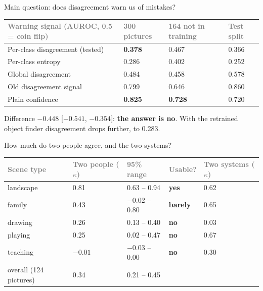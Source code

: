 \documentclass[aspectratio=169,11pt]{beamer}
\newcommand{\yes}[1]{\textcolor{accent}{\textbf{#1}}}
\newcommand{\no}[1]{\textcolor{warn}{\textbf{#1}}}
\newcommand{\h}[1]{\textcolor{grey}{#1}}
\newcommand{\remark}[1]{\par\vspace{0.35cm}{\small\textcolor{grey}{#1}}}
\begin{document}
\begin{frame}{Main question: does disagreement warn us of mistakes?}
\small
\begin{tabular}{@{}L{5.4cm} C{2.2cm} C{2.6cm} C{2.2cm}@{}}
\toprule
\h{Warning signal (AUROC, 0.5 = coin flip)} & \h{300 pictures} & \h{164 not in training} & \h{Test split}\\
\midrule
Per-class disagreement (tested) & \no{0.378} & 0.467 & 0.366\\
Per-class entropy & 0.286 & 0.402 & 0.252\\
Global disagreement & 0.484 & 0.458 & 0.578\\
Old disagreement signal & 0.799 & 0.646 & 0.860\\
Plain confidence & \yes{0.825} & \yes{0.728} & 0.720\\
\bottomrule
\end{tabular}

\vspace{0.3cm}
\normalsize
Difference $-0.448$ [$-0.541$, $-0.354$]: \textbf{the answer is no}. With the retrained object finder disagreement drops further, to 0.283.
\remark{Why: 65 of the 72 mistakes are faint pictures where all agents see nothing. They agree, and they are wrong together.}
\end{frame}

\begin{frame}{How much do two people agree, and the two systems?}
\begin{tabular}{@{}L{2.6cm} C{2.2cm} C{2.8cm} C{2.2cm} C{2.6cm}@{}}
\toprule
\h{Scene type} & \h{Two people ($\kappa$)} & \h{95\% range} & \h{Usable?} & \h{Two systems ($\kappa$)}\\
\midrule
landscape & 0.81 & 0.63 -- 0.94 & \yes{yes} & 0.62\\
family & 0.43 & $-0.02$ -- 0.80 & \no{barely} & 0.65\\
drawing & 0.26 & 0.13 -- 0.40 & \no{no} & 0.03\\
playing & 0.25 & 0.02 -- 0.47 & \no{no} & 0.67\\
teaching & $-0.01$ & $-0.03$ -- 0.00 & \no{no} & 0.30\\
\midrule
overall (124 pictures) & 0.34 & 0.21 -- 0.45 & & \\
\bottomrule
\end{tabular}
\remark{Same 124 pictures. Two systems = scene matcher and describer. They agree with each other more than people do for teaching, family and playing, which does not make them right. ``Drawing'' fails for both systems: almost every picture in the archive is a drawing.}
\end{frame}
\end{document}
